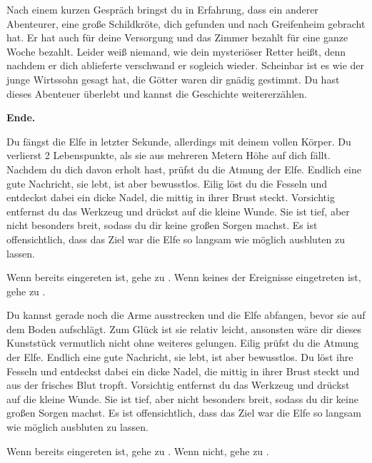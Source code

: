 Nach einem kurzen Gespräch bringst du in Erfahrung, dass ein anderer Abenteurer, eine große Schildkröte, dich gefunden und nach Greifenheim gebracht hat. Er hat auch für deine Versorgung und das Zimmer bezahlt für eine ganze Woche bezahlt. Leider weiß niemand, wie dein mysteriöser Retter heißt, denn nachdem er dich ablieferte verschwand er sogleich wieder. Scheinbar ist es wie der junge Wirtssohn gesagt hat, die Götter waren dir gnädig gestimmt. Du hast dieses Abenteuer überlebt und kannst die Geschichte weitererzählen.

\textbf{Ende.}


Du fängst die Elfe in letzter Sekunde, allerdings mit deinem vollen Körper. Du verlierst 2 Lebenspunkte, als sie aus mehreren Metern Höhe auf dich fällt. Nachdem du dich davon erholt hast, prüfst du die Atmung der Elfe. Endlich eine gute Nachricht, sie lebt, ist aber bewusstlos. Eilig löst du die Fesseln und entdeckst dabei ein dicke Nadel, die mittig in ihrer Brust steckt. Vorsichtig entfernst du das Werkzeug  und drückst auf die kleine Wunde. Sie ist tief, aber nicht besonders breit, sodass du dir keine großen Sorgen machst. Es ist offensichtlich, dass das Ziel war die Elfe so langsam wie möglich ausbluten zu lassen.

Wenn  bereits eingereten ist, gehe zu . Wenn keines der Ereignisse eingetreten ist, gehe zu .


Du kannst gerade noch die Arme ausstrecken und die Elfe abfangen, bevor sie auf dem Boden aufschlägt. Zum Glück ist sie relativ leicht, ansonsten wäre dir dieses Kunststück vermutlich nicht ohne weiteres gelungen. Eilig prüfst du die Atmung der Elfe. Endlich eine gute Nachricht, sie lebt, ist aber bewusstlos. Du löst ihre Fesseln und entdeckst dabei ein dicke Nadel, die mittig in ihrer Brust steckt und aus der frisches Blut tropft. Vorsichtig entfernst du das Werkzeug  und drückst auf die kleine Wunde. Sie ist tief, aber nicht besonders breit, sodass du dir keine großen Sorgen machst. Es ist offensichtlich, dass das Ziel war die Elfe so langsam wie möglich ausbluten zu lassen.

Wenn  bereits eingereten ist, gehe zu .
Wenn nicht, gehe zu .

